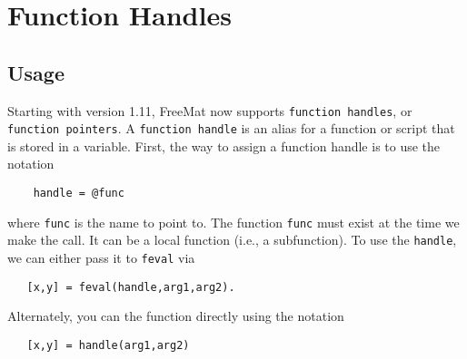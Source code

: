 \section{Function Handles}

\subsection{Usage}

Starting with version 1.11, FreeMat now supports \verb|function handles|,
or \verb|function pointers|.  A \verb|function handle| is an alias for a function
or script that is stored in a variable.  First, the way to assign
a function handle is to use the notation
\begin{verbatim}
    handle = @func
\end{verbatim}
where \verb|func| is the name to point to.  The function \verb|func| must exist
at the time we make the call.  It can be a local function (i.e., a
subfunction).  To use the \verb|handle|, we can either pass it to \verb|feval|
via 
\begin{verbatim}
   [x,y] = feval(handle,arg1,arg2).
\end{verbatim}
Alternately, you can the function directly using the notation
\begin{verbatim}
   [x,y] = handle(arg1,arg2)
\end{verbatim}
